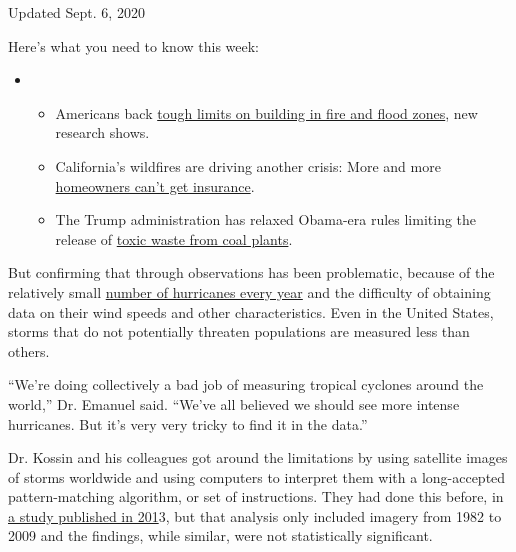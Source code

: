 Updated Sept. 6, 2020

Here's what you need to know this week:

\begin{itemize}
\item
  \begin{itemize}
  \tightlist
  \item
    Americans back
    \href{https://www.nytimes3xbfgragh.onion/2020/09/04/climate/flood-fire-building-restrictions.html?action=click\&pgtype=Article\&state=default\&region=MAIN_CONTENT_1\&context=storylines_keepup}{tough
    limits on building in fire and flood zones}, new research shows.
  \item
    California's wildfires are driving another crisis: More and more
    \href{https://www.nytimes3xbfgragh.onion/2020/09/02/climate/wildfires-insurance.html?action=click\&pgtype=Article\&state=default\&region=MAIN_CONTENT_1\&context=storylines_keepup}{homeowners
    can't get insurance}.
  \item
    The Trump administration has relaxed Obama-era rules limiting the
    release of
    \href{https://www.nytimes3xbfgragh.onion/2020/08/31/climate/trump-coal-plants.html?action=click\&pgtype=Article\&state=default\&region=MAIN_CONTENT_1\&context=storylines_keepup}{toxic
    waste from coal plants}.
  \end{itemize}
\end{itemize}

But confirming that through observations has been problematic, because
of the relatively small
\href{https://www.nytimes3xbfgragh.onion/2020/05/21/climate/hurricane-season-2020-noaa.html}{number
of hurricanes every year} and the difficulty of obtaining data on their
wind speeds and other characteristics. Even in the United States, storms
that do not potentially threaten populations are measured less than
others.

``We're doing collectively a bad job of measuring tropical cyclones
around the world,'' Dr. Emanuel said. ``We've all believed we should see
more intense hurricanes. But it's very very tricky to find it in the
data.''

Dr. Kossin and his colleagues got around the limitations by using
satellite images of storms worldwide and using computers to interpret
them with a long-accepted pattern-matching algorithm, or set of
instructions. They had done this before, in
\href{https://journals.ametsoc.org/doi/full/10.1175/JCLI-D-13-00262.1}{a
study published in 201}3, but that analysis only included imagery from
1982 to 2009 and the findings, while similar, were not statistically
significant.

